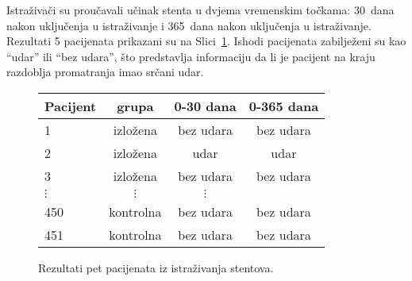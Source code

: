 Istraživači su proučavali učinak stenta u dvjema vremenskim točkama: 30~dana nakon uključenja u istraživanje i 365~dana nakon uključenja u istraživanje. Rezultati 5 pacijenata prikazani su na Slici~\ref{stentStudyResultsDF}. Ishodi pacijenata zabilježeni su kao ``udar'' ili ``bez udara'', što predstavlja informaciju da li je pacijent na kraju razdoblja promatranja imao srčani udar.


\begin{figure}[h]
	\centering
	\begin{tabular}{l ccc}
		\hline
		Pacijent	&	grupa	&	0-30 dana 	&	0-365 dana \\
		\hline
		1		&	izložena &	bez udara &	bez udara \\
		2		&	izložena &	udar & udar \\
		3		&	izložena &	bez udara & bez udara \\
		$\vdots$	&	$\vdots$	  &	$\vdots$ \\
		450	&	kontrolna &	bez udara &	bez udara \\
		451	&	kontrolna &	bez udara &	bez udara \\
		\hline
	\end{tabular}
	\caption{Rezultati pet pacijenata iz istraživanja stentova.}
	\label{stentStudyResultsDF}
\end{figure}


